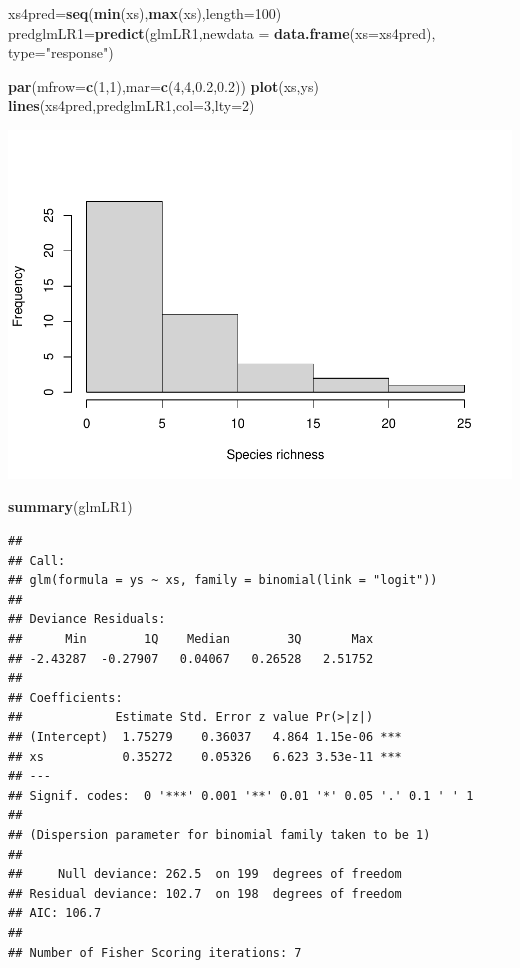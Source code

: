 \documentclass[
]{book}
\newenvironment{Shaded}{\begin{snugshade}}{\end{snugshade}}
\newcommand{\DataTypeTok}[1]{\textcolor[rgb]{0.13,0.29,0.53}{#1}}
\newcommand{\DecValTok}[1]{\textcolor[rgb]{0.00,0.00,0.81}{#1}}
\newcommand{\FloatTok}[1]{\textcolor[rgb]{0.00,0.00,0.81}{#1}}
\newcommand{\KeywordTok}[1]{\textcolor[rgb]{0.13,0.29,0.53}{\textbf{#1}}}
\newcommand{\NormalTok}[1]{#1}
\newcommand{\StringTok}[1]{\textcolor[rgb]{0.31,0.60,0.02}{#1}}
\begin{document}
\begin{Shaded}
\begin{Highlighting}[]
\NormalTok{xs4pred=}\KeywordTok{seq}\NormalTok{(}\KeywordTok{min}\NormalTok{(xs),}\KeywordTok{max}\NormalTok{(xs),}\DataTypeTok{length=}\DecValTok{100}\NormalTok{)}
\NormalTok{predglmLR1=}\KeywordTok{predict}\NormalTok{(glmLR1,}\DataTypeTok{newdata =} \KeywordTok{data.frame}\NormalTok{(}\DataTypeTok{xs=}\NormalTok{xs4pred),}
\DataTypeTok{type=}\StringTok{"response"}\NormalTok{)}

\KeywordTok{par}\NormalTok{(}\DataTypeTok{mfrow=}\KeywordTok{c}\NormalTok{(}\DecValTok{1}\NormalTok{,}\DecValTok{1}\NormalTok{),}\DataTypeTok{mar=}\KeywordTok{c}\NormalTok{(}\DecValTok{4}\NormalTok{,}\DecValTok{4}\NormalTok{,}\FloatTok{0.2}\NormalTok{,}\FloatTok{0.2}\NormalTok{))}
\KeywordTok{plot}\NormalTok{(xs,ys)}
\KeywordTok{lines}\NormalTok{(xs4pred,predglmLR1,}\DataTypeTok{col=}\DecValTok{3}\NormalTok{,}\DataTypeTok{lty=}\DecValTok{2}\NormalTok{)}
\end{Highlighting}
\end{Shaded}

\includegraphics{ECOMODbook_files/figure-latex/unnamed-chunk-13-1.pdf}

\begin{Shaded}
\begin{Highlighting}[]
\KeywordTok{summary}\NormalTok{(glmLR1)}
\end{Highlighting}
\end{Shaded}

\begin{verbatim}
## 
## Call:
## glm(formula = ys ~ xs, family = binomial(link = "logit"))
## 
## Deviance Residuals: 
##      Min        1Q    Median        3Q       Max  
## -2.43287  -0.27907   0.04067   0.26528   2.51752  
## 
## Coefficients:
##             Estimate Std. Error z value Pr(>|z|)    
## (Intercept)  1.75279    0.36037   4.864 1.15e-06 ***
## xs           0.35272    0.05326   6.623 3.53e-11 ***
## ---
## Signif. codes:  0 '***' 0.001 '**' 0.01 '*' 0.05 '.' 0.1 ' ' 1
## 
## (Dispersion parameter for binomial family taken to be 1)
## 
##     Null deviance: 262.5  on 199  degrees of freedom
## Residual deviance: 102.7  on 198  degrees of freedom
## AIC: 106.7
## 
## Number of Fisher Scoring iterations: 7
\end{verbatim}
\end{document}
